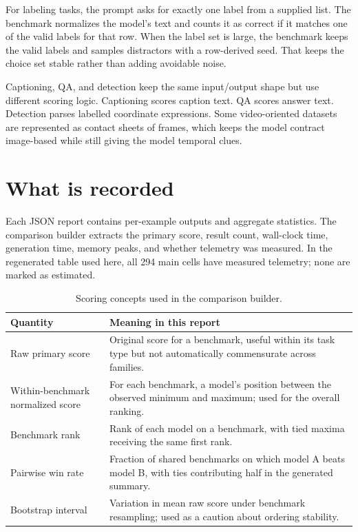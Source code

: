 \documentclass[11pt,a4paper]{report}
\begin{document}
For labeling tasks, the prompt asks for exactly one label from a supplied
list.  The benchmark normalizes the model's text and counts it as correct if
it matches one of the valid labels for that row.  When the label set is large,
the benchmark keeps the valid labels and samples distractors with a row-derived
seed.  That keeps the choice set stable rather than adding avoidable noise.

Captioning, QA, and detection keep the same input/output shape but use
different scoring logic.  Captioning scores caption text.  QA scores answer
text.  Detection parses labelled coordinate expressions.  Some video-oriented
datasets are represented as contact sheets of frames, which keeps the model
contract image-based while still giving the model temporal clues.

\section{What is recorded}
Each JSON report contains per-example outputs and aggregate statistics.  The
comparison builder extracts the primary score, result count, wall-clock time,
generation time, memory peaks, and whether telemetry was measured.  In the
regenerated table used here, all 294 main cells have measured telemetry; none
are marked as estimated.

\begin{table}[H]
\centering
\caption{Scoring concepts used in the comparison builder.}
\begin{tabularx}{\textwidth}{p{38mm} X}
\toprule
Quantity & Meaning in this report \\
\midrule
Raw primary score & Original score for a benchmark, useful within its task
type but not automatically commensurate across families. \\
Within-benchmark normalized score & For each benchmark, a model's position
between the observed minimum and maximum; used for the overall ranking. \\
Benchmark rank & Rank of each model on a benchmark, with tied maxima receiving
the same first rank. \\
Pairwise win rate & Fraction of shared benchmarks on which model A beats
model B, with ties contributing half in the generated summary. \\
Bootstrap interval & Variation in mean raw score under benchmark resampling;
used as a caution about ordering stability. \\
\bottomrule
\end{tabularx}
\end{table}
\end{document}
